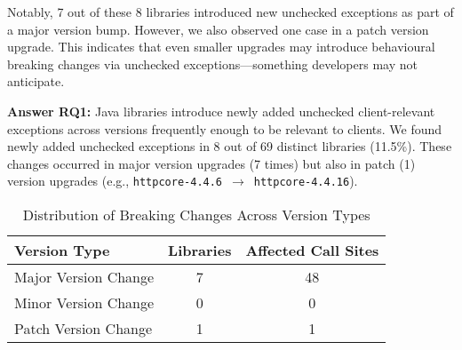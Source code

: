 Notably, 7 out of these 8 libraries introduced new unchecked exceptions as part of a major version bump. However, we also observed one case in a patch version upgrade. This indicates that even smaller upgrades may introduce behavioural breaking changes via unchecked exceptions—something developers may not anticipate.

\vspace{1em}
\begin{tcolorbox}[colback=gray!10, colframe=black]
\textbf{Answer RQ1:} Java libraries introduce newly added unchecked client-relevant exceptions across versions frequently enough to be relevant to clients. We found newly added unchecked exceptions in 8 out of 69 distinct libraries (11.5\%). These changes occurred in major version upgrades (7 times) but also in patch (1) version upgrades (e.g., \texttt{httpcore-4.4.6}~$\rightarrow$~\texttt{httpcore-4.4.16}).
\end{tcolorbox}
\vspace{1em}

\begin{table}[h]
\centering
\caption{Distribution of Breaking Changes Across Version Types}
\label{tab:version-distribution}
\begin{tabular}{lcc}
\toprule
\textbf{Version Type} & \textbf{Libraries} & \textbf{Affected Call Sites} \\
\midrule
Major Version Change & 7 & 48 \\
Minor Version Change & 0 & 0 \\
Patch Version Change & 1 & 1 \\
\bottomrule
\end{tabular}
\end{table}

